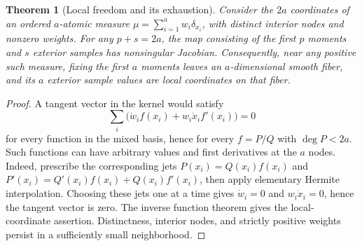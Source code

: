 \documentclass{article}
\newtheorem{theorem}{Theorem}
\begin{document}
\begin{theorem}[Local freedom and its exhaustion]
Consider the $2a$ coordinates of an ordered $a$-atomic measure
$\mu=\sum_{i=1}^a w_i\delta_{x_i}$, with distinct interior nodes and
nonzero weights. For any $p+s=2a$, the map consisting of the first $p$
moments and $s$ exterior samples has nonsingular Jacobian.
Consequently, near any positive such measure, fixing the first $a$
moments leaves an $a$-dimensional smooth fiber, and its $a$ exterior
sample values are local coordinates on that fiber.
\end{theorem}
\begin{proof}
A tangent vector in the kernel would satisfy
\[
 \sum_i\bigl(\dot w_i f(x_i)+w_i\dot x_i f'(x_i)\bigr)=0
\]
for every function in the mixed basis, hence for every $f=P/Q$ with
$\deg P<2a$. Such functions can have arbitrary values and first
derivatives at the $a$ nodes. Indeed, prescribe the corresponding jets
$P(x_i)=Q(x_i)f(x_i)$ and
$P'(x_i)=Q'(x_i)f(x_i)+Q(x_i)f'(x_i)$, then apply elementary Hermite
interpolation. Choosing these jets one at a time gives
$\dot w_i=0$ and $w_i\dot x_i=0$, hence the tangent vector is zero.
The inverse function theorem gives the local-coordinate assertion.
Distinctness, interior nodes, and strictly positive weights persist in
a sufficiently small neighborhood.
\end{proof}
\end{document}

